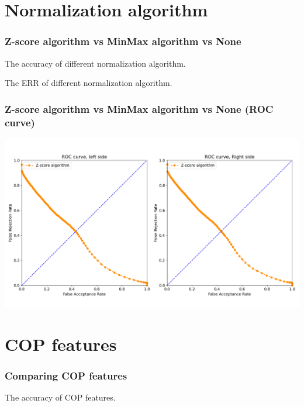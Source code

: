 \documentclass{beamer}
\begin{document}
\section{Normalization algorithm}
\def \variable {MinMax}%

\begin{frame}
\frametitle{Z-score algorithm vs MinMax algorithm vs None}
\tiny
\begin{table}
\centering
\captionsetup{labelformat=empty}
\caption{\small The accuracy of different normalization algorithm.}
\label{tab:parameters condition}

\end{table}
\begin{table}
\centering
\captionsetup{labelformat=empty}
\caption{\small The ERR of different normalization algorithm.}
\label{tab:parameters condition}

\end{table}
\end{frame}


\begin{frame}
\centering
\frametitle{Z-score algorithm vs MinMax algorithm vs None (ROC curve)}
\includegraphics[scale=0.3]{Manuscripts/src/figures/MinMax.png}
\end{frame}




\section{COP features}


\begin{frame}
\frametitle{Comparing COP features}
\tiny
\begin{table}
\centering
\captionsetup{labelformat=empty}
\caption{\small The accuracy of COP features.}
\label{tab:parameters condition}

\end{table}
\end{frame}
\end{document}
